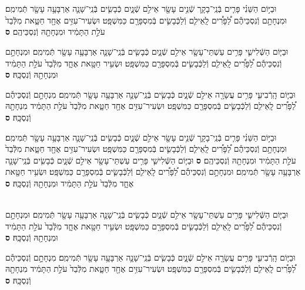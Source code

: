 \documentclass[twoside, openany, parskip=half, 11pt]{book}
\begin{document}
\begin{sometimes}
\begin{footnotesize}
\begin{multicols}{2}

\\
\\
וּבַיּ֣וֹם הַשֵּׁנִ֗י פָּרִ֧ים בְּֿנֵֽי־בָקָ֛ר שְֿׁנֵ֥ים עָשָׂ֖ר אֵילִ֣ם שְֿׁנָ֑יִם כְּֿבָשִׂ֧ים בְּֿנֵֽי־שָׁנָ֛ה אַרְבָּעָ֥ה עָשָׂ֖ר תְּֿמִימִֽם׃ וּמִנְחָתָ֣ם וְֿנִסְכֵּיהֶ֡ם לַ֠פָּרִ֠ים לָֽאֵילִ֧ם וְֿלַכְּֿבָשִׂ֛ים בְּֿמִסְפָּרָ֖ם כַּמִּשְׁפָּֽט׃ וּשְׂעִיר־עִזִּ֥ים אֶחָ֖ד חַטָּ֑את מִלְּֿבַד֙ עֹלַ֣ת הַתָּמִ֔יד וּמִנְחָתָ֖הּ וְֿנִסְכֵּיהֶֽם׃ \textbf{ס}

וּבַיּ֧וֹם הַשְּֿׁלִישִׁ֛י פָּרִ֥ים עַשְׁתֵּי־עָשָׂ֖ר אֵילִ֣ם שְֿׁנָ֑יִם כְּֿבָשִׂ֧ים בְּֿנֵֽי־שָׁנָ֛ה אַרְבָּעָ֥ה עָשָׂ֖ר תְּֿמִימִֽם׃ וּמִנְחָתָ֣ם וְֿנִסְכֵּיהֶ֡ם לַ֠פָּרִ֠ים לָֽאֵילִ֧ם וְֿלַכְּֿבָשִׂ֛ים בְּֿמִסְפָּרָ֖ם כַּמִּשְׁפָּֽט׃ וּשְׂעִ֥יר חַטָּ֖את אֶחָ֑ד מִלְּֿבַד֙ עֹלַ֣ת הַתָּמִ֔יד וּמִנְחָתָ֖הּ וְֿנִסְכָּֽהּ׃ \textbf{ס}

וּבַיּ֧וֹם הָֽרְֿבִיעִ֛י פָּרִ֥ים עֲשָׂרָ֖ה אֵילִ֣ם שְֿׁנָ֑יִם כְּֿבָשִׂ֧ים בְּֿנֵֽי־שָׁנָ֛ה אַרְבָּעָ֥ה עָשָׂ֖ר תְּֿמִימִֽם׃ מִנְחָתָ֣ם וְֿנִסְכֵּיהֶ֡ם לַ֠פָּרִ֠ים לָֽאֵילִ֧ם וְֿלַכְּֿבָשִׂ֛ים בְּֿמִסְפָּרָ֖ם כַּמִּשְׁפָּֽט׃ וּשְׂעִיר־עִזִּ֥ים אֶחָ֖ד חַטָּ֑את מִלְּֿבַד֙ עֹלַ֣ת הַתָּמִ֔יד מִנְחָתָ֖הּ וְֿנִסְכָּֽהּ׃ \textbf{ס}

וּבַיּ֣וֹם הַשֵּׁנִ֗י פָּרִ֧ים בְּֿנֵֽי־בָקָ֛ר שְֿׁנֵ֥ים עָשָׂ֖ר אֵילִ֣ם שְֿׁנָ֑יִם כְּֿבָשִׂ֧ים בְּֿנֵֽי־שָׁנָ֛ה אַרְבָּעָ֥ה עָשָׂ֖ר תְּֿמִימִֽם׃ וּמִנְחָתָ֣ם וְֿנִסְכֵּיהֶ֡ם לַ֠פָּרִ֠ים לָֽאֵילִ֧ם וְֿלַכְּֿבָשִׂ֛ים בְּֿמִסְפָּרָ֖ם כַּמִּשְׁפָּֽט׃ וּשְׂעִיר־עִזִּ֥ים אֶחָ֖ד חַטָּ֑את מִלְּֿבַד֙ עֹלַ֣ת הַתָּמִ֔יד וּמִנְחָתָ֖הּ וְֿנִסְכֵּיהֶֽם׃ \textbf{ס}
וּבַיּ֧וֹם הַשְּֿׁלִישִׁ֛י פָּרִ֥ים עַשְׁתֵּי־עָשָׂ֖ר אֵילִ֣ם שְֿׁנָ֑יִם כְּֿבָשִׂ֧ים בְּֿנֵֽי־שָׁנָ֛ה אַרְבָּעָ֥ה עָשָׂ֖ר תְּֿמִימִֽם׃ וּמִנְחָתָ֣ם וְֿנִסְכֵּיהֶ֡ם לַ֠פָּרִ֠ים לָֽאֵילִ֧ם וְֿלַכְּֿבָשִׂ֛ים בְּֿמִסְפָּרָ֖ם כַּמִּשְׁפָּֽט׃ וּשְׂעִ֥יר חַטָּ֖את אֶחָ֑ד מִלְּֿבַד֙ עֹלַ֣ת הַתָּמִ֔יד וּמִנְחָתָ֖הּ וְֿנִסְכָּֽהּ׃ \textbf{ס}

\\
וּבַיּ֧וֹם הַשְּֿׁלִישִׁ֛י פָּרִ֥ים עַשְׁתֵּי־עָשָׂ֖ר אֵילִ֣ם שְֿׁנָ֑יִם כְּֿבָשִׂ֧ים בְּֿנֵֽי־שָׁנָ֛ה אַרְבָּעָ֥ה עָשָׂ֖ר תְּֿמִימִֽם׃ וּמִנְחָתָ֣ם וְֿנִסְכֵּיהֶ֡ם לַ֠פָּרִ֠ים לָֽאֵילִ֧ם וְֿלַכְּֿבָשִׂ֛ים בְּֿמִסְפָּרָ֖ם כַּמִּשְׁפָּֽט׃ וּשְׂעִ֥יר חַטָּ֖את אֶחָ֑ד מִלְּֿבַד֙ עֹלַ֣ת הַתָּמִ֔יד וּמִנְחָתָ֖הּ וְֿנִסְכָּֽהּ׃ \textbf{ס}

וּבַיּ֧וֹם הָֽרְֿבִיעִ֛י פָּרִ֥ים עֲשָׂרָ֖ה אֵילִ֣ם שְֿׁנָ֑יִם כְּֿבָשִׂ֧ים בְּֿנֵֽי־שָׁנָ֛ה אַרְבָּעָ֥ה עָשָׂ֖ר תְּֿמִימִֽם׃ מִנְחָתָ֣ם וְֿנִסְכֵּיהֶ֡ם לַ֠פָּרִ֠ים לָֽאֵילִ֧ם וְֿלַכְּֿבָשִׂ֛ים בְּֿמִסְפָּרָ֖ם כַּמִּשְׁפָּֽט׃ וּשְׂעִיר־עִזִּ֥ים אֶחָ֖ד חַטָּ֑את מִלְּֿבַד֙ עֹלַ֣ת הַתָּמִ֔יד מִנְחָתָ֖הּ וְֿנִסְכָּֽהּ׃ \textbf{ס}


\end{multicols}
\end{footnotesize}
\end{sometimes}
\end{document}
